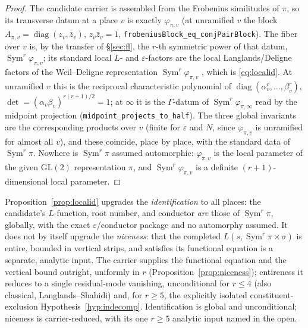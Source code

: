 \documentclass[11pt]{article}
\theoremstyle{definition}
\newcommand{\Sym}{\operatorname{Sym}}
\begin{document}
\begin{proof}
The candidate carrier is assembled from the Frobenius similitudes of $\pi$, so its transverse datum at a
place $v$ is exactly $\varphi_{\pi,v}$ (at unramified $v$ the block $A_{\pi,v}=\operatorname{diag}(z_v,
\bar z_v)$, $z_v\bar z_v=1$, \texttt{frobeniusBlock\_eq\_conjPairBlock}). The fiber over $v$ is, by the
transfer of \S\ref{sec:fl}, the $r$-th symmetric power of that datum, $\Sym^r\varphi_{\pi,v}$; its
standard local $L$- and $\varepsilon$-factors are the local Langlands/Deligne factors of the
Weil--Deligne representation $\Sym^r\varphi_{\pi,v}$ \cite{Tate}, which is \eqref{eq:localid}. At
unramified $v$ this is the reciprocal characteristic polynomial of
$\operatorname{diag}(\alpha_v^{r},\dots,\beta_v^{r})$, $\det=(\alpha_v\beta_v)^{r(r+1)/2}=1$; at $\infty$
it is the $\Gamma$-datum of $\Sym^r\varphi_{\pi,\infty}$ read by the midpoint projection
(\texttt{midpoint\_projects\_to\_half}). The three global invariants are the corresponding products over
$v$ (finite for $\varepsilon$ and $N$, since $\varphi_{\pi,v}$ is unramified for almost all $v$), and
these coincide, place by place, with the standard data of $\Sym^r\pi$. Nowhere is $\Sym^r\pi$ assumed
automorphic: $\varphi_{\pi,v}$ is the local parameter of the given $\mathrm{GL}(2)$ representation $\pi$,
and $\Sym^r\varphi_{\pi,v}$ is a definite $(r{+}1)$-dimensional local parameter.
\end{proof}

Proposition~\ref{prop:localid} upgrades the \emph{identification} to all places: the candidate's
$L$-function, root number, and conductor \emph{are} those of $\Sym^r\pi$, globally, with the exact
$\varepsilon$/conductor package and no automorphy assumed. It does not by itself upgrade the \emph{niceness}: that
the completed $L(s,\Sym^r\pi\times\sigma)$ is entire, bounded in vertical strips, and satisfies its
functional equation is a separate, analytic input. The carrier supplies the functional equation and the
vertical bound outright, uniformly in $r$ (Proposition~\ref{prop:niceness}); entireness it reduces to a
single residual-mode vanishing, unconditional for $r\le4$ (also classical, Langlands--Shahidi) and, for
$r\ge5$, the explicitly isolated constituent-exclusion Hypothesis~\ref{hyp:indecomp}. Identification is
global and unconditional; niceness is carrier-reduced, with its one $r\ge5$ analytic input named in the open.
\end{document}
